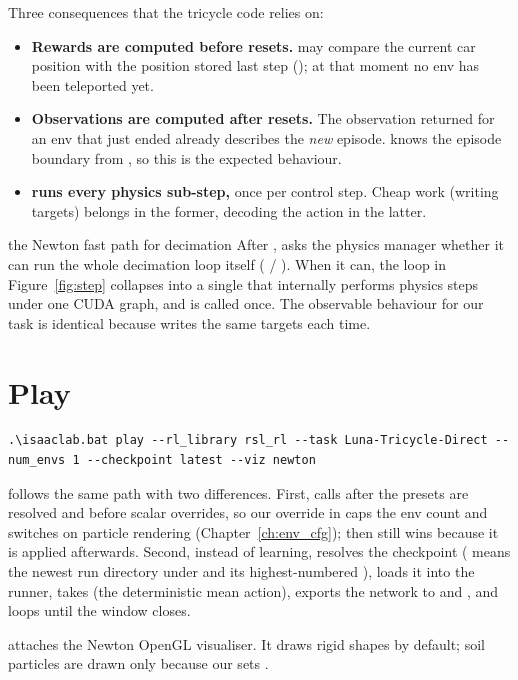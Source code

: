 Three consequences that the tricycle code relies on:

\begin{itemize}[leftmargin=1.6em]
  \item \textbf{Rewards are computed before resets.}  may
        compare the current car position with the position stored last step
        (); at that moment no env has been teleported yet.
  \item \textbf{Observations are computed after resets.} The observation
        returned for an env that just ended already describes the
        \emph{new} episode.  knows the episode boundary from
        , so this is the expected behaviour.
  \item \textbf{ runs every physics sub-step,}
         once per control step. Cheap work (writing
        targets) belongs in the former, decoding the action in the latter.
\end{itemize}

\begin{isaacbox}{the Newton fast path for decimation}
After ,  asks the physics manager whether
it can run the whole decimation loop itself
( /
). When it can, the loop in
Figure~\ref{fig:step} collapses into a single  that internally
performs  physics steps under one CUDA graph, and
 is called once. The observable behaviour for our task
is identical because  writes the same targets each time.
\end{isaacbox}

\section{Play}
\label{sec:play}

\begin{lstlisting}[style=shell]
.\isaaclab.bat play --rl_library rsl_rl --task Luna-Tricycle-Direct --num_envs 1 --checkpoint latest --viz newton
\end{lstlisting}

 follows the same path with two differences. First,
 calls
 after the presets are resolved and before scalar
overrides, so our override in  caps the env count and
switches on particle rendering (Chapter~\ref{ch:env_cfg}); 
then still wins because it is applied afterwards. Second, instead of learning,
 resolves the checkpoint ( means the newest
run directory under  and its highest-numbered
), loads it into the runner, takes
 (the deterministic mean action), exports
the network to  and , and loops
 until the window closes.

 attaches the Newton OpenGL visualiser. It draws rigid
shapes by default; soil particles are drawn only because our
 sets .
